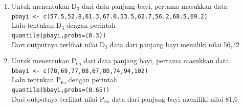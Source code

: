 \documentclass[a4paper,12pt]{article}
\begin{document}
\begin{enumerate}[label=\alph*.]
	\item \begin{minipage}[t]{\linewidth}
		\raggedright
	\end{minipage}
	Untuk menentukan D$_{3}$ dari data panjang bayi, pertama masukkan data\\
	\texttt{pbayi <- c(57.5,52.8,61.3,67.0,53.5,62.7,56.2,68.5,69.2)\\}
	Lalu tentukan D$_{3}$ dengan perintah\\
	\texttt{quantile(pbayi,probs=(0.3))\\}
	Dari outputnya terlihat nilai D$_{3}$ data dari panjang bayi memiliki nilai 56,72
	
	\item 
	\begin{minipage}[t]{\linewidth}
		\raggedright
	\end{minipage}
	Untuk menentukan P$_{65}$ dari data panjang bayi, pertama masukkan data\\
	\texttt{bbayi <- c(78,69,77,88,67,80,74,94,102)\\}
	Lalu tentukan P$_{65}$ dengan perintah\\
	\texttt{quantile(bbayi,probs=(0.65))\\}
	Dari outputnya terlihat nilai P$_{65}$ data dari panjang bayi memiliki nilai 81,6
	

\end{enumerate}
\end{document}
